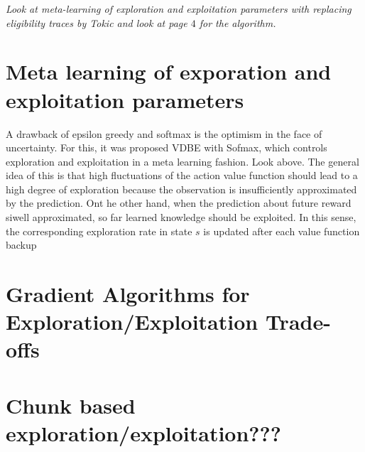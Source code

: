 \documentclass[10.5pt]{article}
\begin{document}
\emph{Look at meta-learning of exploration and exploitation parameters with replacing eligibility traces by Tokic and look at page $4$ for the algorithm.}
\section{Meta learning of exporation and exploitation parameters}
A drawback of epsilon greedy and softmax is the optimism in the face of uncertainty. For this, it was proposed VDBE with Sofmax, which controls exploration and exploitation in a meta learning fashion. Look above. The general idea of this is that high fluctuations of the action value function should lead to a high degree of exploration because the observation is insufficiently approximated by the prediction. Ont he other hand, when the prediction about future reward siwell approximated, so far learned knowledge should be exploited. In this sense, the corresponding exploration rate in state $s$ is updated after each value function backup 


\section{Gradient Algorithms for Exploration/Exploitation Trade-offs}

\section{Chunk based exploration/exploitation???}
\end{document}
